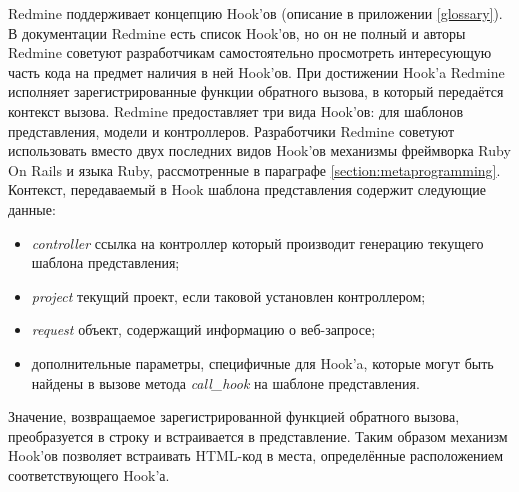 Redmine поддерживает концепцию Hook'ов (описание в приложении \ref{glossary}).
В документации Redmine есть список Hook'ов, но он не полный и авторы Redmine
советуют разработчикам самостоятельно просмотреть интересующую часть кода на
предмет наличия в ней Hook'ов. При достижении Hook'a Redmine исполняет
зарегистрированные функции обратного вызова, в который передаётся контекст
вызова. Redmine предоставляет три вида Hook'ов: для шаблонов представления,
модели и контроллеров. Разработчики Redmine советуют использовать вместо двух
последних видов Hook'ов механизмы фреймворка Ruby On Rails и языка Ruby,
рассмотренные в параграфе \ref{section:metaprogramming}. Контекст, передаваемый
в Hook шаблона представления содержит следующие данные:
\begin{itemize}
  \item \textit{controller} ссылка на контроллер который производит генерацию
  текущего шаблона представления;
  \item \textit{project} текущий проект, если таковой установлен контроллером;
  \item \textit{request} объект, содержащий информацию о веб-запросе;
  \item дополнительные параметры, специфичные для Hook'a, которые могут
  быть найдены в вызове метода \textit{call\_hook} на шаблоне представления.
\end{itemize}
Значение, возвращаемое зарегистрированной функцией обратного вызова,
преобразуется в строку и встраивается в представление. Таким образом механизм
Hook'ов позволяет встраивать HTML-код в места, определённые расположением
соответствующего Hook'а.


